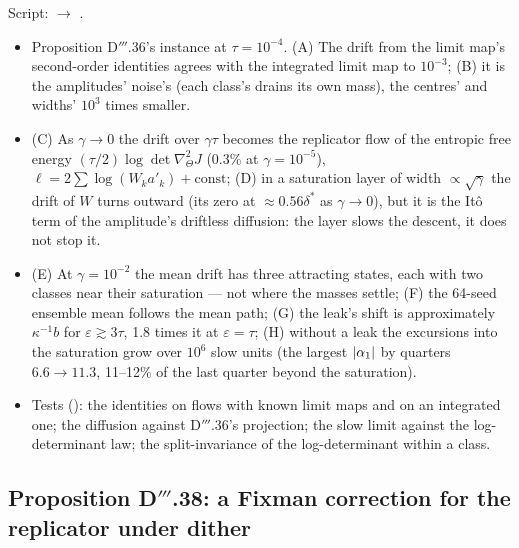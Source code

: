 Script:  $\to$ .
\begin{itemize}
  \item Proposition D$'''$.36's instance at $\tau = 10^{-4}$. (A) The drift from the limit map's second-order
    identities agrees with the integrated limit map to $10^{-3}$; (B) it is the amplitudes' noise's (each class's
    drains its own mass), the centres' and widths' $10^3$ times smaller.
  \item (C) As $\gamma\to0$ the drift over $\gamma\tau$ becomes the replicator flow of the entropic free energy
    $(\tau/2)\log\det\nabla^2_\Theta J$ (0.3\% at $\gamma = 10^{-5}$), $\ell = 2\sum\log(W_ka'_k) + \text{const}$;
    (D) in a saturation layer of width $\propto\sqrt\gamma$ the drift of $W$ turns outward (its zero at
    $\approx0.56\delta^*$ as $\gamma\to0$), but it is the It\^o term of the amplitude's driftless diffusion: the layer
    slows the descent, it does not stop it.
  \item (E) At $\gamma = 10^{-2}$ the mean drift has three attracting states, each with two classes near their
    saturation --- not where the masses settle; (F) the 64-seed ensemble mean follows the mean path; (G) the leak's
    shift is approximately $\kappa^{-1}b$ for $\varepsilon\gtrsim3\tau$, 1.8 times it at $\varepsilon = \tau$;
    (H) without a leak the excursions into the saturation grow over $10^6$ slow units (the largest $\lvert \alpha_1\rvert$ by
    quarters $6.6\to11.3$, 11--12\% of the last quarter beyond the saturation).
  \item Tests (): the identities on flows with known limit maps and on an integrated
    one; the diffusion against D$'''$.36's projection; the slow limit against the log-determinant law; the
    split-invariance of the log-determinant within a class.
\end{itemize}

\subsection{Proposition D\texorpdfstring{$'''$}{'''}.38: a Fixman correction for the replicator under dither}


